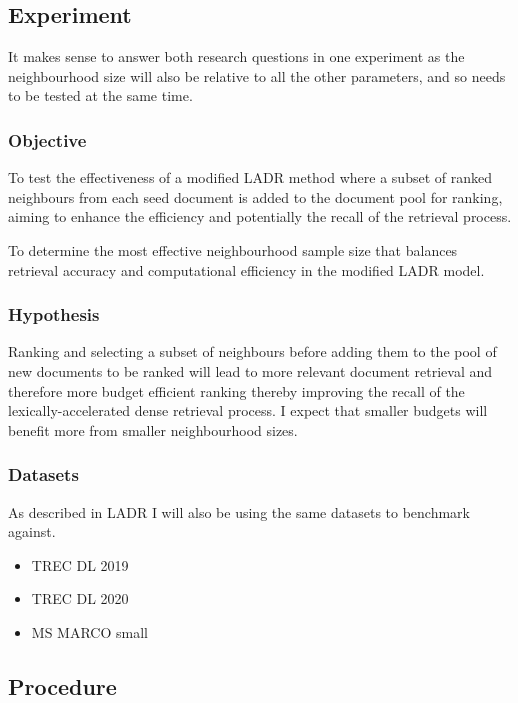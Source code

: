 \documentclass[sigconf,authorversion,nonacm]{acmart}
\begin{document}
\subsection{Experiment}

It makes sense to answer both research questions in one experiment as the neighbourhood size will
also be relative to all the other parameters, and so needs to be tested at the same time.

\subsubsection{Objective}

To test the effectiveness of a modified LADR method where a subset of ranked neighbours from each
seed document is added to the document pool for ranking, aiming to enhance the efficiency and
potentially the recall of the retrieval process.

To determine the most effective neighbourhood sample size that balances retrieval accuracy and
computational efficiency in the modified LADR model.

\subsubsection{Hypothesis}

Ranking and selecting a subset of neighbours before adding them to the pool of new documents to be
ranked will lead to more relevant document retrieval and therefore more budget efficient ranking
thereby improving the recall of the lexically-accelerated dense retrieval process. I expect that
smaller budgets will benefit more from smaller neighbourhood sizes.

\subsubsection{Datasets}

As described in LADR\cite{ladr} I will also be using the same datasets to benchmark against.

\begin{itemize}
	\item TREC DL 2019
	\item TREC DL 2020
	\item MS MARCO small
\end{itemize}

\subsection{Procedure}
\end{document}

